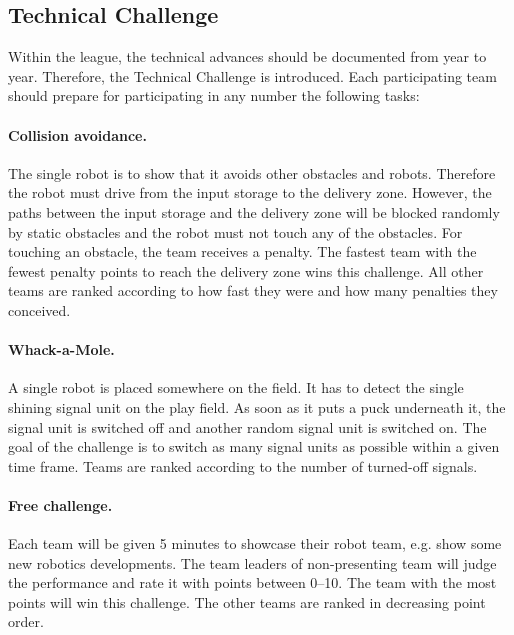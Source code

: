 \documentclass[12pt,twoside]{article}
\begin{document}
\subsection{Technical Challenge}
  
  Within the league, the technical advances should be documented from
  year to year. Therefore, the Technical Challenge is introduced.
  Each participating team should prepare for participating in any
  number the following tasks:


  \paragraph{Collision avoidance.~}
  The single robot is to show that it avoids other obstacles and robots.
  Therefore the robot must drive from the input storage to the delivery zone.
  However, the paths between the input storage and the delivery zone will
  be blocked randomly by static obstacles and the robot must not touch any
  of the obstacles. For touching an obstacle, the team receives a penalty.
  The fastest team with the fewest penalty points to reach the delivery
  zone wins this challenge. All other teams are ranked according to
  how fast they were and how many penalties they conceived.
  
  \paragraph{Whack-a-Mole.~}
  A single robot is placed somewhere on the field. It has to detect
  the single shining signal unit on the play field. As soon as it puts
  a puck underneath it, the signal unit is switched off and another
  random signal unit is switched on. The goal of the challenge is to
  switch as many signal units as possible within a given time
  frame. Teams are ranked according to the number of turned-off
  signals.
  

  \paragraph{Free challenge.~}
  Each team will be given 5 minutes to showcase their robot team, e.g.
  show some new robotics developments. The team leaders of
  non-presenting team will judge the performance and rate it with
  points between 0--10.  The team with the most points will win this
  challenge. The other teams are ranked in decreasing point order.
\end{document}

